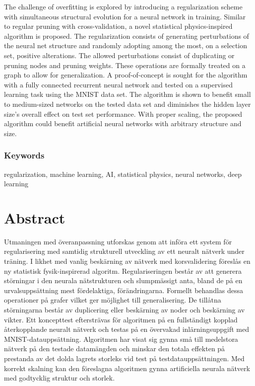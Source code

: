The challenge of overfitting is explored by introducing a regularization scheme with simultaneous structural evolution for a neural network in training. Similar to regular pruning with cross-validation, a novel statistical physics-inspired algorithm is proposed. The regularization consists of generating perturbations of the neural net structure and randomly adopting among the most, on a selection set, positive alterations. The allowed perturbations consist of duplicating or pruning nodes and pruning weights. These operations are formally treated on a graph to allow for generalization. A proof-of-concept is sought for the algorithm with a fully connected recurrent neural network and tested on a supervised learning task using the MNIST data set. The algorithm is shown to benefit small to medium-sized networks on the tested data set and diminishes the hidden layer size's overall effect on test set performance. With proper scaling, the proposed algorithm could benefit artificial neural networks with arbitrary structure and size.


\subsection*{Keywords}
regularization, machine learning, AI, statistical physics, neural networks, deep learning


\newpage
\thispagestyle{plain}
\chapter*{Abstract}
Utmaningen med överanpassning utforskas genom att införa ett system för regularisering med samtidig strukturell utveckling av ett neuralt nätverk under träning. I likhet med vanlig beskärning av nätverk med korsvalidering föreslås en ny statistisk fysik-inspirerad algoritm. Regulariseringen består av att generera störningar i den neurala nätstrukturen och slumpmässigt anta, bland de på en urvalsuppsättning mest fördelaktiga, förändringarna. Formellt behandlas dessa operationer på grafer vilket ger möjlighet till generalisering. De tillåtna störningarna består av duplicering eller beskärning av noder och beskärning av vikter. Ett koncepttest eftersträvas för algoritmen på en fullständigt kopplad återkopplande neuralt nätverk och testas på en övervakad inlärningsuppgift med MNIST-datauppsättning. Algoritmen har visat sig gynna små till medelstora nätverk på den testade datamängden och minskar den totala effekten på prestanda av det dolda lagrets storleks vid test på testdatauppsättningen. Med korrekt skalning kan den föreslagna algoritmen gynna artificiella neurala nätverk med godtycklig struktur och storlek.

